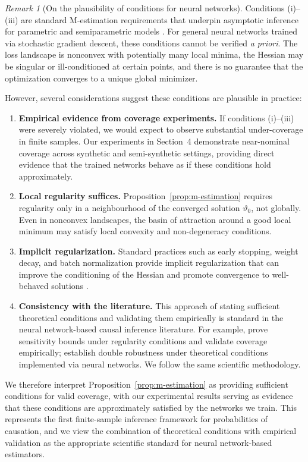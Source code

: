 \documentclass[accepted]{uai2026} %
\theoremstyle{plain}
\theoremstyle{definition}
\theoremstyle{remark}
\newtheorem{remark}[theorem]{Remark}
\begin{document}
\begin{remark}[On the plausibility of conditions for neural networks]\label{remark:nn-conditions}
Conditions (i)--(iii) are standard M-estimation requirements that underpin asymptotic inference 
for parametric and semiparametric models \citep{newey1994largesample,vandervaart1998asymptotic}. 
For general neural networks trained via stochastic gradient descent, these conditions cannot be 
verified \emph{a priori}. The loss landscape is nonconvex with potentially many local minima, 
the Hessian may be singular or ill-conditioned at certain points, and there is no guarantee 
that the optimization converges to a unique global minimizer.

However, several considerations suggest these conditions are plausible in practice:
%
\begin{enumerate}
\item \textbf{Empirical evidence from coverage experiments.} 
If conditions (i)--(iii) were severely violated, we would expect to observe substantial 
under-coverage in finite samples. Our experiments in Section~4 demonstrate near-nominal 
coverage across synthetic and semi-synthetic settings, providing direct evidence that 
the trained networks behave as if these conditions hold approximately.

\item \textbf{Local regularity suffices.} 
Proposition~\ref{prop:m-estimation} requires regularity only in a neighbourhood of the 
converged solution $\vartheta_0$, not globally. Even in nonconvex landscapes, 
the basin of attraction around a good local minimum may satisfy local convexity 
and non-degeneracy conditions.

\item \textbf{Implicit regularization.} 
Standard practices such as early stopping, weight decay, and batch normalization 
provide implicit regularization that can improve the conditioning of the Hessian 
and promote convergence to well-behaved solutions 
\citep[see, e.g.,][for theoretical perspectives]{blanc2020implicit, li2018algorithmic}.

\item \textbf{Consistency with the literature.} 
This approach of stating sufficient theoretical conditions and validating them empirically 
is standard in the neural network-based causal inference literature. 
For example, \citet{frauen2024neural} prove sensitivity bounds under regularity conditions 
and validate coverage empirically; \citet{chen2024doubly} establish double robustness 
under theoretical conditions implemented via neural networks. 
We follow the same scientific methodology.
\end{enumerate}
%
We therefore interpret Proposition~\ref{prop:m-estimation} as providing sufficient conditions 
for valid coverage, with our experimental results serving as evidence that these conditions 
are approximately satisfied by the networks we train. 
This represents the first finite-sample inference framework for probabilities of causation, 
and we view the combination of theoretical conditions with empirical validation as the 
appropriate scientific standard for neural network-based estimators.
\end{remark}
\end{document}

